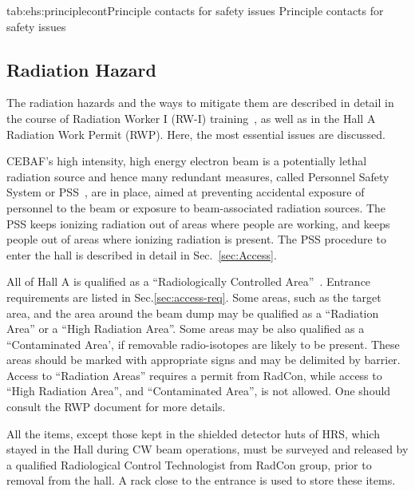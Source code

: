 \begin{namestab}{tab:ehs:principlecont}{Principle contacts for safety issues}{%
   Principle contacts for safety issues}
\end{namestab}
 
\begin{safetyen}{0}{0}
\section{Radiation Hazard} 
\label{sec:radhazard}
\end{safetyen}
  The radiation hazards and the ways to mitigate them are described in detail in the
  course of Radiation Worker I (RW-I) training~\cite{RWIcebaf},
  as well as in the Hall A Radiation Work Permit (RWP).
  Here, the most essential issues are discussed.

  CEBAF's high intensity, high energy electron beam 
  is a potentially lethal radiation source and hence many redundant measures,
  called Personnel Safety System or PSS~\cite{PSScebaf}, are in place,
   aimed at preventing accidental exposure of personnel to the beam or exposure 
  to beam-associated radiation sources.
  The PSS keeps ionizing radiation out of areas where people are working,
  and keeps people out of areas where ionizing radiation is present. 
  The PSS procedure to enter the hall is described in detail in  Sec.~\ref{sec:Access}.


 All of Hall A is qualified as a ``Radiologically Controlled Area''~\cite{RWIcebaf}.
 Entrance requirements are listed in Sec.\ref{sec:access-req}.
 Some areas, such as the target area, and the area around the beam dump may be qualified as 
 a ``Radiation Area'' or a ``High Radiation Area''. Some areas may be also qualified 
 as a ``Contaminated Area', if removable radio-isotopes are likely to be present.
 These areas should be marked with appropriate signs and may be delimited by barrier. 
 Access to ``Radiation Areas'' requires a permit from RadCon, while access
 to ``High Radiation Area'', and ``Contaminated Area'', is not allowed. One should consult 
 the RWP document for more details.

 All the items, except those kept in the shielded detector huts of HRS,
          which stayed in the Hall during CW beam operations,
          must be surveyed and released by a qualified Radiological Control Technologist from
          RadCon group, prior to removal from the hall.
          A rack close to the entrance is used to store these items.

